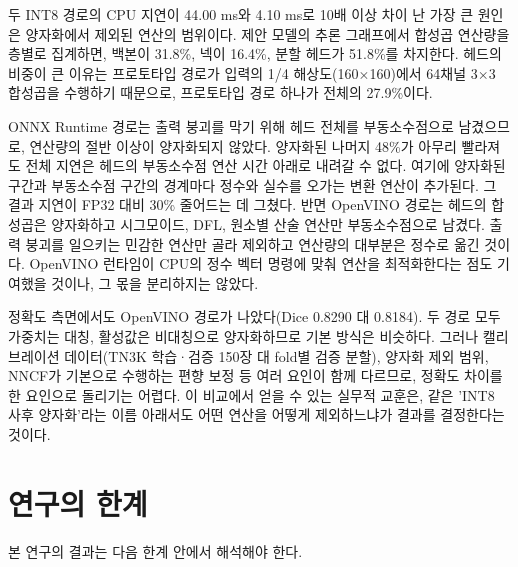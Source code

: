 두 INT8 경로의 CPU 지연이 44.00 ms와 4.10 ms로 10배 이상 차이 난 가장 큰 원인은 양자화에서 제외된 연산의 범위이다.
제안 모델의 추론 그래프에서 합성곱 연산량을 층별로 집계하면, 백본이 31.8\%, 넥이 16.4\%, 분할 헤드가 51.8\%를 차지한다.
헤드의 비중이 큰 이유는 프로토타입 경로가 입력의 1/4 해상도(160$\times$160)에서 64채널 3$\times$3 합성곱을 수행하기
때문으로, 프로토타입 경로 하나가 전체의 27.9\%이다.

ONNX Runtime 경로는 출력 붕괴를 막기 위해 헤드 전체를 부동소수점으로 남겼으므로, 연산량의 절반 이상이 양자화되지
않았다. 양자화된 나머지 48\%가 아무리 빨라져도 전체 지연은 헤드의 부동소수점 연산 시간 아래로 내려갈 수 없다.
여기에 양자화된 구간과 부동소수점 구간의 경계마다 정수와 실수를 오가는 변환 연산이 추가된다. 그 결과 지연이 FP32 대비
30\% 줄어드는 데 그쳤다. 반면 OpenVINO 경로는 헤드의 합성곱은 양자화하고 시그모이드, DFL, 원소별 산술 연산만
부동소수점으로 남겼다. 출력 붕괴를 일으키는 민감한 연산만 골라 제외하고 연산량의 대부분은 정수로 옮긴 것이다.
OpenVINO 런타임이 CPU의 정수 벡터 명령에 맞춰 연산을 최적화한다는 점도 기여했을 것이나, 그 몫을 분리하지는 않았다.

정확도 측면에서도 OpenVINO 경로가 나았다(Dice 0.8290 대 0.8184). 두 경로 모두 가중치는 대칭, 활성값은 비대칭으로 양자화하므로
기본 방식은 비슷하다. 그러나 캘리브레이션 데이터(TN3K 학습·검증 150장 대 fold별 검증 분할), 양자화 제외 범위, NNCF가 기본으로
수행하는 편향 보정 등 여러 요인이 함께 다르므로, 정확도 차이를 한 요인으로 돌리기는 어렵다. 이 비교에서 얻을 수 있는 실무적 교훈은, 같은 'INT8 사후 양자화'라는
이름 아래서도 어떤 연산을 어떻게 제외하느냐가 결과를 결정한다는 것이다.

\section{연구의 한계}\label{sec:limitations}

본 연구의 결과는 다음 한계 안에서 해석해야 한다.

